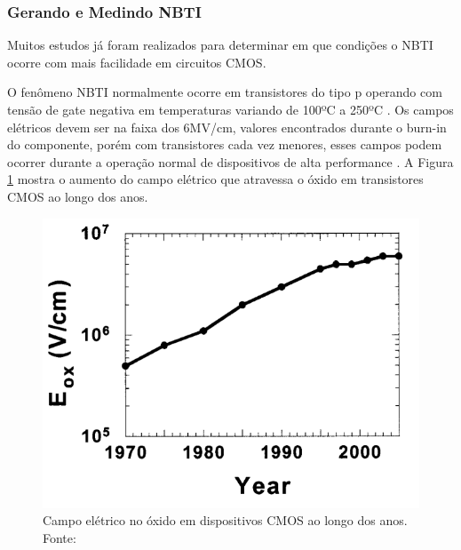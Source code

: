 \subsubsection{Gerando e Medindo NBTI}
\label{sec:GerandoNbti}

Muitos estudos já foram realizados para determinar em que condições o NBTI ocorre com mais facilidade em circuitos CMOS.

O fenômeno NBTI normalmente ocorre em transistores do tipo p operando com tensão de gate negativa em temperaturas variando de 100ºC a 250ºC \cite{Davidovic}. Os campos elétricos devem ser na faixa dos 6MV/cm, valores encontrados durante o burn-in do componente, porém com transistores cada vez menores, esses campos podem ocorrer durante a operação normal de dispositivos de alta performance \cite{Schroder}. A Figura \ref{fig:CampoEletricoAno} mostra o aumento do campo elétrico que atravessa o óxido em transistores CMOS ao longo dos anos.

\begin{figure}[H]
    \centering
    \includegraphics[scale=0.5]{figures/ReferencialTeorico/CampoEletricoAno.png}
    \caption{Campo elétrico no óxido em dispositivos CMOS ao longo dos anos. Fonte: \cite{Schroder}}
    \label{fig:CampoEletricoAno}
\end{figure}


